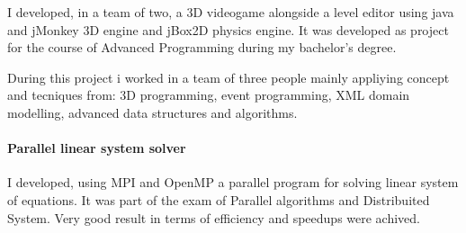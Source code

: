 \documentclass[a4paper,10pt]{article}
\begin{document}
I developed, in a team of two, a 3D videogame alongside a level editor using
java and jMonkey 3D engine and jBox2D physics engine.
It was developed as project for the course of Advanced Programming during my
bachelor's degree.

\noindent During this project i worked in a team of three people mainly
appliying concept and tecniques from:
\noindent 3D programming, event programming, XML domain modelling, advanced
data structures and algorithms.

 \paragraph{Parallel linear system solver} 

I developed, using MPI and OpenMP a  parallel program for solving linear system
of equations. It was part of the exam of Parallel algorithms and
Distribuited System. Very good result in terms of efficiency and speedups were
achived.
\end{document}

